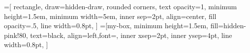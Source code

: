 =[
    rectangle,
    draw=hidden-draw,
    rounded corners,
    text opacity=1,
    minimum height=1.5em,
    minimum width=5em,
    inner sep=2pt,
    align=center,
    fill opacity=.5,
    line width=0.8pt,
]
=[my-box, minimum height=1.5em,
    fill=hidden-pink!80, text=black, align=left,font=\normalsize,
    inner xsep=2pt,
    inner ysep=4pt,
    line width=0.8pt,
]

    
